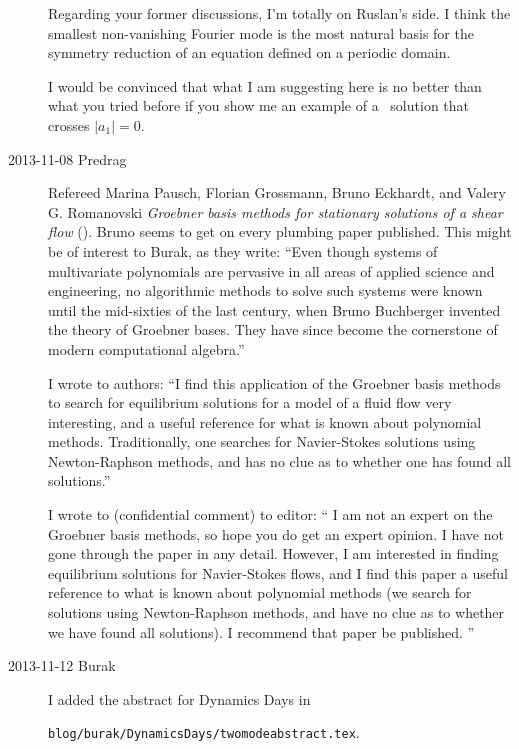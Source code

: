 \begin{description}
Regarding your former discussions, I'm totally on Ruslan's side. I think the
smallest non-vanishing Fourier mode is the most natural basis for the symmetry
reduction of an equation defined on a periodic domain.

I would be convinced that what I am suggesting here is no better than what
you tried before if you show me an example of a \KS\ solution that crosses
$|a_1| = 0$.

\item[2013-11-08  Predrag]
Refereed Marina Pausch, Florian Grossmann, Bruno Eckhardt, and Valery
G. Romanovski {\em Groebner basis methods for stationary
solutions of a shear flow}
(). Bruno
seems to get on every plumbing paper published. This might be of
interest to Burak, as they write: ``Even though systems of
multivariate polynomials are pervasive in all areas of applied
science and engineering, no algorithmic methods to solve such systems
were known until the mid-sixties of the last century, when Bruno
Buchberger invented the theory of Groebner bases. They have since
become the cornerstone of modern computational algebra.''


I wrote to authors:
``I find this application of the Groebner basis methods to search for
equilibrium solutions for a model of a fluid flow very interesting,
and a useful reference for what is known about polynomial methods.
Traditionally, one searches for Navier-Stokes solutions using
Newton-Raphson methods, and has no clue as to whether one has found
all solutions.''

I wrote to (confidential comment) to editor:
`` I am not an expert on the Groebner basis methods, so hope you do
get an expert opinion. I have not gone through the paper in any
detail. However, I am interested in finding equilibrium solutions for
Navier-Stokes flows, and I find this paper a useful reference to what
is known about polynomial methods (we search for solutions using
Newton-Raphson methods, and have no clue as to whether we have found
all solutions). I recommend that paper be published. ''

\item[2013-11-12  Burak]
I added the abstract for Dynamics Days in 

\texttt{blog/burak/DynamicsDays/twomodeabstract.tex}.


\end{description}
\renewcommand{\ssp}{a}
